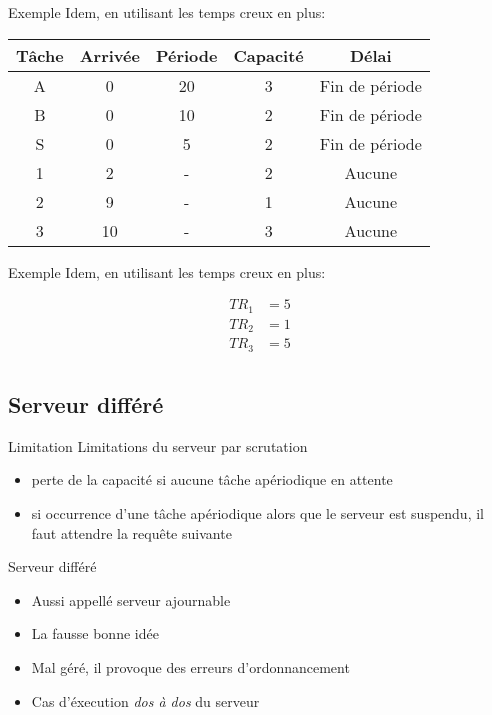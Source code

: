 \begin{frame}{Exemple}
  Idem, en utilisant les temps creux en plus:
  \begin{center}
    \begin{tabular}{ccccc}
      \hline
      Tâche & Arrivée & Période & Capacité & Délai \\
      \hline
      A &  0 & 20 & 3 & Fin de période\\
      B &  0 & 10 & 2 & Fin de période\\
      S &  0 &  5 & 2 & Fin de période\\
      1 &  2 &  - & 2 & Aucune\\
      2 &  9 &  - & 1 & Aucune\\
      3 & 10 &  - & 3 & Aucune\\
      \hline
    \end{tabular}
    \pause
    
  \end{center}
\end{frame} 

\begin{frame}{Exemple}
  Idem, en utilisant les temps creux en plus:
  \begin{center}
    
    \begin{align*}
      TR_1 &= 5\\
      TR_2 &= 1\\
      TR_3 &= 5\\
    \end{align*}
  \end{center}
\end{frame} 

\subsection{Serveur différé}

\begin{frame}{Limitation} 
  Limitations du serveur par scrutation 
  \begin{itemize}
  \item perte de la capacité si aucune tâche apériodique en attente
  \item si occurrence d'une tâche apériodique alors que le serveur est
    suspendu, il faut attendre la requête suivante
  \end{itemize}
\end{frame} 

\begin{frame}{Serveur différé}
  \begin{itemize} 
  \item Aussi appellé serveur ajournable
  \item La fausse bonne idée
  \item Mal géré, il provoque des erreurs d'ordonnancement
  \item Cas d'éxecution \emph{dos à dos} du serveur
  \end{itemize}
\end{frame}


